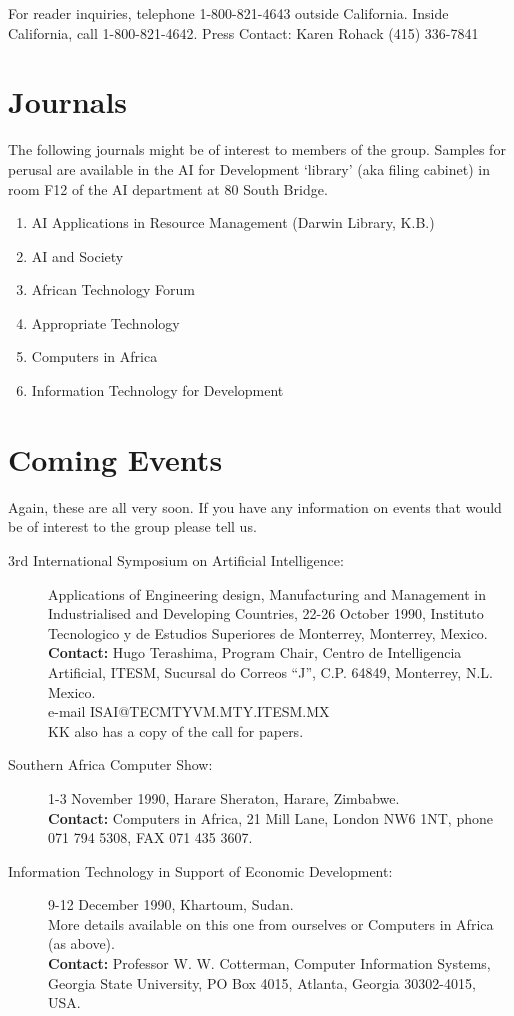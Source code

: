 For reader inquiries, telephone 1-800-821-4643 outside California.
Inside California, call 1-800-821-4642.  
Press Contact: Karen Rohack (415) 336-7841

\section{Journals}
The following journals might be of interest to members of the group.
Samples for perusal are available in the AI for Development `library'
(aka filing cabinet) in room F12 of the AI department at 80 South Bridge.
\begin{enumerate}
\item AI Applications in Resource Management  (Darwin Library, K.B.)
\item AI and Society 
\item African Technology Forum
\item Appropriate Technology
\item Computers in Africa
\item Information Technology for Development
\end{enumerate}

\section{Coming Events}
Again, these are all very soon. If you have any information on events
that would be of interest to the group please tell us.
\begin{description}
\item[3rd International Symposium on Artificial Intelligence:]
Applications of Engineering design, Manufacturing and Management in
Industrialised and Developing Countries,
22-26 October 1990, Instituto Tecnologico y de Estudios Superiores de
Monterrey, Monterrey, Mexico.\\
{\bf Contact:} Hugo Terashima, Program Chair, Centro de Intelligencia
Artificial, ITESM, Sucursal do Correos ``J'', C.P. 64849, Monterrey,
N.L. Mexico.\\
e-mail ISAI@TECMTYVM.MTY.ITESM.MX\\
KK also has a copy of the call for papers.
\item[Southern Africa Computer Show:]
 1-3 November 1990, Harare Sheraton, Harare, Zimbabwe.\\
{\bf Contact:} Computers in Africa, 21 Mill Lane, London NW6 1NT,
phone 071 794 5308, FAX 071 435 3607. 
\item[Information Technology in Support of Economic Development:]
9-12 December 1990, Khartoum, Sudan.\\
More details available on this one from ourselves or Computers in
Africa (as above).\\
{\bf Contact:} Professor W. W. Cotterman, Computer Information
Systems, Georgia State University, PO Box 4015, Atlanta, Georgia
30302-4015, USA. 
\end{description}

